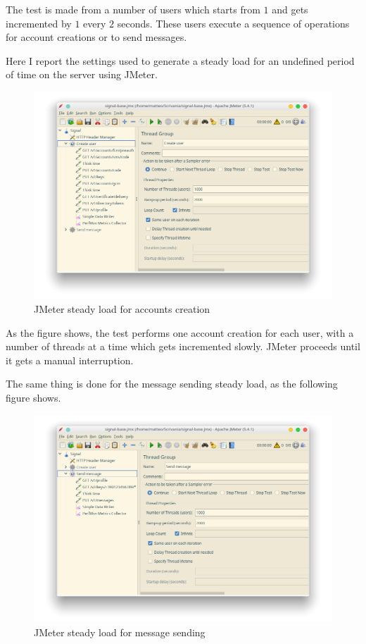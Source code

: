 The test is made from a number of users which starts from $1$ and gets incremented by $1$ every $2$ seconds.
These users execute a sequence of operations for account creations or to send messages. 

Here I report the settings used to generate a steady load for an undefined period of time on the server using JMeter.

\begin{figure}[H]
    \centering
    \includegraphics[width=\textwidth]{images/jmeter-steady-create}
    \caption{JMeter steady load for accounts creation}
    \label{fig:jmeterbaseuser}
\end{figure}

As the figure shows, the test performs one account creation for each user, with a number of threads at a time which gets incremented slowly. JMeter proceeds until it gets a manual interruption.

The same thing is done for the message sending steady load, as the following figure shows.

\begin{figure}[H]
    \centering
    \includegraphics[width=\textwidth]{images/jmeter-steady-message}
    \caption{JMeter steady load for message sending}
    \label{fig:jmeterbasemessage}
\end{figure}


